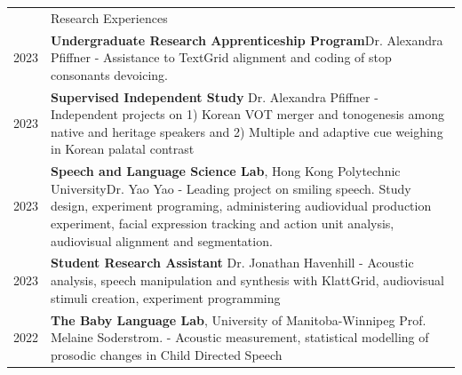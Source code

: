 \documentclass[letterpaper, 11pt]{article}
\newcommand{\headingfont}{\Large\color{MidnightBlue}}
\newenvironment{SectionTable}[1]{
	\renewcommand*{\arraystretch}{1.7}
	\setlength{\tabcolsep}{10pt}
	\begin{longtable}{Rp{6.3in}} & #1 \\}
{\end{longtable}\vspace{-.3cm}}
\begin{document}
\begin{SectionTable}{\headingfont Research Experiences}

 2023 &
 \textbf{Undergraduate Research Apprenticeship Program}\hfill Dr. Alexandra Pfiffner \newline
	- Assistance to TextGrid alignment and coding of stop consonants devoicing.\\
	2023&
	\textbf{Supervised Independent Study} \hfill Dr. Alexandra Pfiffner \newline 
	- Independent projects on 1) Korean VOT merger and tonogenesis among native and heritage speakers and 2) Multiple and adaptive cue weighing in Korean palatal contrast \\

2023 &
	\textbf{Speech and Language Science Lab}, Hong Kong Polytechnic University\hfill Dr. Yao Yao\newline 
	- Leading project on smiling speech. Study design, experiment programing, administering audiovidual production experiment, facial expression tracking and action unit analysis, audiovisual alignment and segmentation.\\
2023 &
\textbf{Student Research Assistant} \hfill Dr. Jonathan Havenhill \newline
	- Acoustic analysis, speech manipulation and synthesis with KlattGrid, audiovisual stimuli creation, experiment programming\\

2022 &
\textbf{The Baby Language Lab}, University of Manitoba-Winnipeg \hfill Prof. Melaine Soderstrom. \newline
	- Acoustic measurement, statistical modelling of prosodic changes in Child Directed Speech\\


\end{SectionTable}
\end{document}
